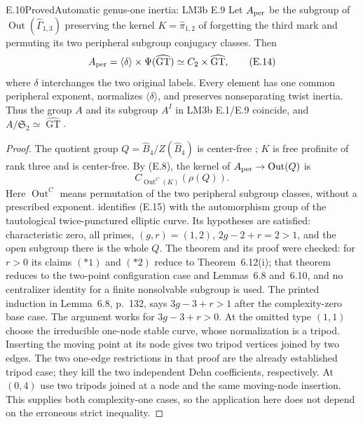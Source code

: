 \begin{result}{E.10}{Proved}{Automatic genus-one inertia: LM3b E.9}
Let $A_{\rm per}$ be the subgroup of
$\operatorname{Out}(\widehat\Gamma_{1,3})$ preserving the kernel
$K=\widehat\pi_{1,2}$ of forgetting the third mark and permuting its
two peripheral subgroup conjugacy classes.  Then
\[
 A_{\rm per}=\langle\delta\rangle\times
                    \Psi(\widehat{\operatorname{GT}})
       \simeq C_2\times\widehat{\operatorname{GT}},          \tag{E.14}
\]
where $\delta$ interchanges the two original labels.  Every element
has one common peripheral exponent, normalizes $\langle\delta\rangle$,
and preserves nonseparating twist inertia.  Thus the group $A$ and
its subgroup $A^I$ in LM3b E.1/E.9 coincide, and
$A/\mathfrak S_2\simeq\widehat{\operatorname{GT}}$.
\end{result}
\begin{proof}
The quotient group $Q=\widehat B_4/Z(\widehat B_4)$ is center-free
\cite[\S2, equation (2.9)]{ET_MN2022}; $K$ is free profinite of
rank three and is center-free.  By (E.8), the kernel of
$A_{\rm per}\to\operatorname{Out}(Q)$ is
\[
 C_{\operatorname{Out}^{C}(K)}(\rho(Q)).                    \tag{E.15}
\]
Here $\operatorname{Out}^{C}$ means permutation of the two
peripheral subgroup classes, without a prescribed exponent.
\cite[Theorem 6.13(ii), equivalently Theorem D(i)]{ET_HMTopicsI2012}
identifies (E.15) with the automorphism group of the tautological
twice-punctured elliptic curve.  Its hypotheses are satisfied:
characteristic zero, all primes, $(g,r)=(1,2)$, $2g-2+r=2>1$,
and the open subgroup there is the whole $Q$.  The theorem and its
proof were checked: for $r>0$ its claims $(\ast1)$ and $(\ast2)$
reduce to Theorem~6.12(i); that theorem reduces to the two-point
configuration case and Lemmas~6.8 and~6.10, and no centralizer
identity for a finite nonsolvable subgroup is used.
The printed induction in Lemma~6.8, p.~132, says $3g-3+r>1$
after the complexity-zero base case.  The argument works for
$3g-3+r>0$.  At the omitted type $(1,1)$ choose the irreducible
one-node stable curve, whose normalization is a tripod.  Inserting
the moving point at its node gives two tripod vertices joined by
two edges.  The two one-edge restrictions in that proof are the
already established tripod case; they kill the two independent
Dehn coefficients, respectively.  At $(0,4)$ use two tripods
joined at a node and the same moving-node insertion.  This supplies
both complexity-one cases, so the application here does not
depend on the erroneous strict inequality.


\end{proof}
